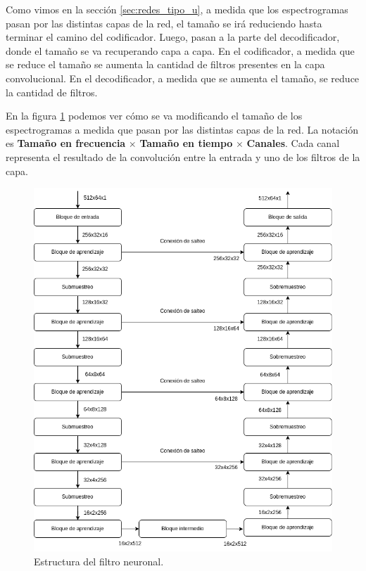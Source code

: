 Como vimos en la sección \ref{sec:redes_tipo_u}, a medida que los espectrogramas pasan por las distintas capas de la red, el tamaño se irá reduciendo hasta terminar el camino del codificador. Luego, pasan a la parte del decodificador, donde el tamaño se va recuperando capa a capa. En el codificador, a medida que se reduce el tamaño se aumenta la cantidad de filtros presentes en la capa convolucional. En el decodificador, a medida que se aumenta el tamaño, se reduce la cantidad de filtros.

En la figura \ref{fig:ch7_red_estructura} podemos ver cómo se va modificando el tamaño de los espectrogramas a medida que pasan por las distintas capas de la red. La notación es \textbf{Tamaño en frecuencia} $\times$ \textbf{Tamaño en tiempo} $\times$ \textbf{Canales}. Cada canal representa el resultado de la convolución entre la entrada y uno de los filtros de la capa.

\begin{figure}
	\centering
	\centerline{\includegraphics[scale=0.65]{images/ch7/red_estructura.png}}
	\caption{Estructura del filtro neuronal.}
	\label{fig:ch7_red_estructura}
\end{figure}


